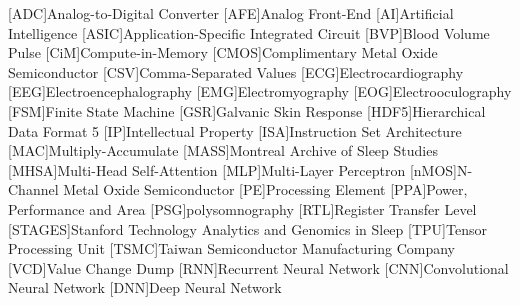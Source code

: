 \begin{acronym} {
    \small{}
    [ADC]{Analog-to-Digital Converter}
    [AFE]{Analog Front-End}
    [AI]{Artificial Intelligence}
    [ASIC]{Application-Specific Integrated Circuit}
    [BVP]{Blood Volume Pulse}
    [CiM]{Compute-in-Memory}
    [CMOS]{Complimentary Metal Oxide Semiconductor}
    [CSV]{Comma-Separated Values}
    [ECG]{Electrocardiography}
    [EEG]{Electroencephalography}
    [EMG]{Electromyography}
    [EOG]{Electrooculography}
    [FSM]{Finite State Machine}
    [GSR]{Galvanic Skin Response}
    [HDF5]{Hierarchical Data Format 5}
    [IP]{Intellectual Property}
    [ISA]{Instruction Set Architecture}
    [MAC]{Multiply-Accumulate}
    [MASS]{Montreal Archive of Sleep Studies}
    [MHSA]{Multi-Head Self-Attention}
    [MLP]{Multi-Layer Perceptron}
    [nMOS]{N-Channel Metal Oxide Semiconductor}
    [PE]{Processing Element}
    [PPA]{Power, Performance and Area}
    [PSG]{polysomnography}
    [RTL]{Register Transfer Level}
    [STAGES]{Stanford Technology Analytics and Genomics in Sleep}
    [TPU]{Tensor Processing Unit}
    [TSMC]{Taiwan Semiconductor Manufacturing Company}
    [VCD]{Value Change Dump}
    [RNN]{Recurrent Neural Network}
    [CNN]{Convolutional Neural Network}
    [DNN]{Deep Neural Network}
}
\end{acronym}